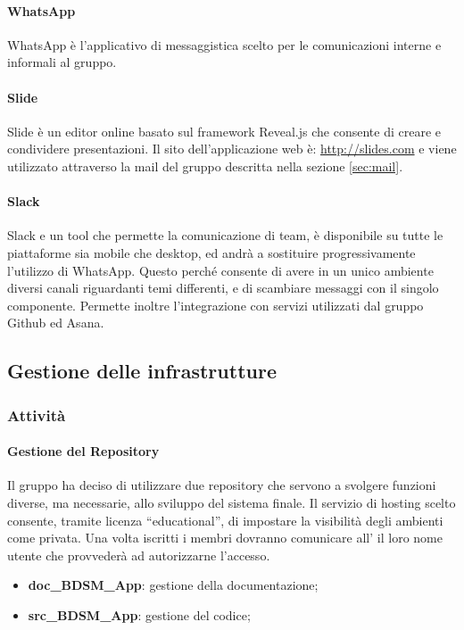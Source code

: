			\paragraph{WhatsApp}
			WhatsApp è l'applicativo di messaggistica scelto per le comunicazioni interne e informali al gruppo.
			\paragraph{Slide}
			Slide è un editor online basato sul framework Reveal.js che consente di creare e condividere presentazioni. \newline
			Il sito dell'applicazione web è: \url{http://slides.com} e viene utilizzato attraverso la mail del gruppo descritta nella sezione \ref{sec:mail}.
			\paragraph{Slack}
			Slack e un tool che permette la comunicazione di team, è disponibile su tutte le piattaforme sia mobile che desktop, ed andrà a sostituire progressivamente l'utilizzo di WhatsApp. Questo perché consente di avere in un unico ambiente diversi canali riguardanti temi differenti, e di scambiare messaggi con il singolo componente. Permette inoltre l'integrazione con servizi utilizzati dal gruppo Github ed Asana. 


	\subsection{Gestione delle infrastrutture}

		\subsubsection{Attività}
			\paragraph{Gestione del Repository}
			Il gruppo ha deciso di utilizzare due repository che servono a svolgere funzioni diverse, ma necessarie, allo sviluppo del sistema finale. \newline
			Il servizio di hosting scelto consente, tramite licenza ``educational'', di impostare la visibilità degli ambienti come privata. \newline
			Una volta iscritti i membri dovranno comunicare all'\roleAdministrator{} il loro nome utente che provvederà ad autorizzarne l'accesso.
				\begin{itemize}
					\item \textbf{doc\_BDSM\_App}: gestione della documentazione;
					\item \textbf{src\_BDSM\_App}: gestione del codice;
				\end{itemize}
